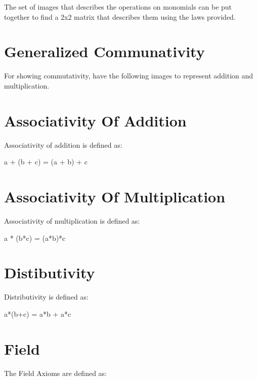 The set of images that describes the operations on monomials can be put together to find a 2x2 matrix that describes them using the laws provided.

\section{Generalized Communativity}

For showing commutativity, have the following images to represent addition and multiplication.

\section{Associativity Of Addition}

Associativity of addition is defined as:

a + (b + c) = (a + b) + c

\section{Associativity Of Multiplication}

Associativity of multiplication is defined as:

a * (b*c) = (a*b)*c

\section{Distibutivity}

Distributivity is defined as:

a*(b+c) = a*b + a*c

\section{Field}

The Field Axioms are defined as:

